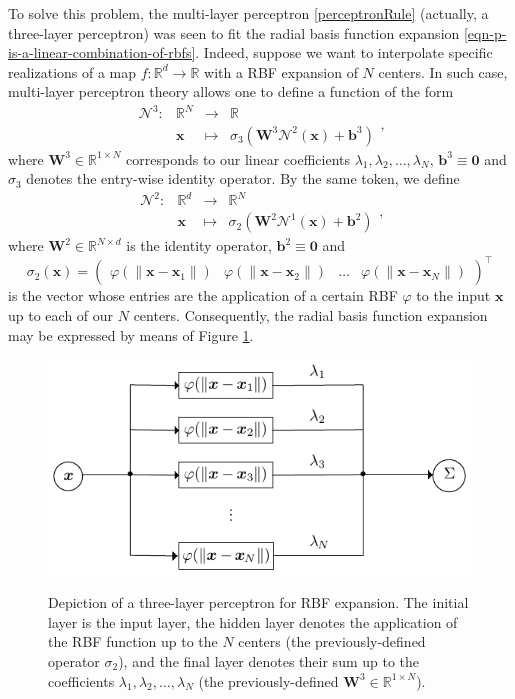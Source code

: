 \documentclass[12pt]{report} %
\newcommand{\tmmathbf}[1]{\ensuremath{\boldsymbol{#1}}}
\begin{document}
To solve this problem, the multi-layer perceptron \eqref{perceptronRule}
(actually, a three-layer perceptron) was seen to fit the radial basis function
expansion \eqref{eqn-p-is-a-linear-combination-of-rbfs}. Indeed, suppose we want
to interpolate specific realizations of a map $f : \mathbb{R}^d \rightarrow
\mathbb{R}$ with a RBF expansion of $N$ centers. In such case, multi-layer
perceptron theory allows one to define a function of the form
\[ \begin{array}{cccc}
     \mathcal{N}^3 : & \mathbb{R}^N & \rightarrow & \mathbb{R}\\
     & \tmmathbf{x} & \mapsto & \sigma_3 (\tmmathbf{W}^3 \mathcal{N}^2
     (\tmmathbf{x}) +\tmmathbf{b}^3)
   \end{array}, \]
where $\tmmathbf{W}^3 \in \mathbb{R}^{1 \times N}$ corresponds to our linear
coefficients $\lambda_1, \lambda_2, \ldots, \lambda_N$, $\tmmathbf{b}^3 \equiv
\tmmathbf{0}$ and $\sigma_3$ denotes the entry-wise identity operator. By the
same token, we define
\[ \begin{array}{cccc}
     \mathcal{N}^2 : & \mathbb{R}^d & \rightarrow & \mathbb{R}^N\\
     & \tmmathbf{x} & \mapsto & \sigma_2 (\tmmathbf{W}^2 \mathcal{N}^1
     (\tmmathbf{x}) +\tmmathbf{b}^2)
   \end{array}, \]
where $\tmmathbf{W}^2 \in \mathbb{R}^{N \times d}$ is the identity operator,
$\tmmathbf{b}^2 \equiv \tmmathbf{0}$ and
\[ \sigma_2 (\tmmathbf{x}) = \left(\begin{array}{cccc}
     \varphi (\| \tmmathbf{x}-\tmmathbf{x}_1 \|) & \varphi (\|
     \tmmathbf{x}-\tmmathbf{x}_2 \|) & \ldots & \varphi (\|
     \tmmathbf{x}-\tmmathbf{x}_N \|)
   \end{array}\right)^{\top} \]
is the vector whose entries are the application of a certain RBF $\varphi$ to the input
$\tmmathbf{x}$ up to each of our $N$ centers. Consequently, the radial basis
function expansion may be expressed by means of Figure \ref{fig-rbf-drawing}.
\begin{figure}[ht]
  {\includegraphics[width=.7\textwidth]{imagenes/rbf_discussion/rbf-nn-graph.pdf}}
  \caption{Depiction of a three-layer perceptron for RBF expansion. The
  initial layer is the input layer, the hidden layer denotes the application
  of the RBF function up to the $N$ centers (the previously-defined operator
  $\sigma_2$), and the final layer denotes their sum up to the coefficients
  $\lambda_1, \lambda_2, \ldots, \lambda_N$ (the previously-defined
  $\tmmathbf{W}^3 \in \mathbb{R}^{1 \times N}$).
  \label{fig-rbf-drawing}}
\end{figure}
\end{document}
